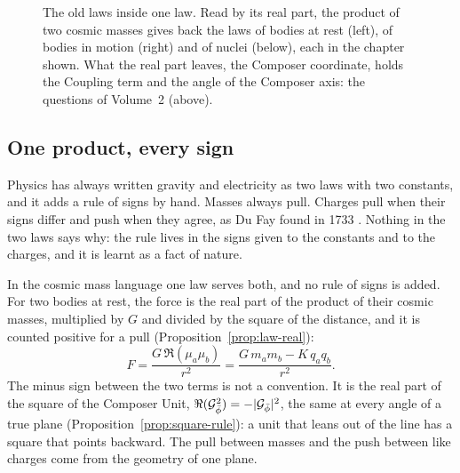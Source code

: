 \begin{figure}[tb]
\caption[The old laws inside one law]{The old laws inside one law. Read by its real part, the product of two cosmic masses gives back the laws of bodies at rest (left), of bodies in motion (right) and of nuclei (below), each in the chapter shown. What the real part leaves, the Composer coordinate, holds the Coupling term and the angle of the Composer axis: the questions of Volume~2 (above).}
\label{fig:al-map}
\end{figure}

\subsection{One product, every sign}\label{subsec:al-sign}

Physics has always written gravity and electricity as two laws with two constants, and it adds a rule of signs by hand. Masses always pull. Charges pull when their signs differ and push when they agree, as Du Fay found in 1733 \citep{DuFay1733}. Nothing in the two laws says why: the rule lives in the signs given to the constants and to the charges, and it is learnt as a fact of nature.

In the cosmic mass language one law serves both, and no rule of signs is added. For two bodies at rest, the force is the real part of the product of their cosmic masses, multiplied by $G$ and divided by the square of the distance, and it is counted positive for a pull (Proposition~\ref{prop:law-real}):
\[
F = \frac{G\,\Re(\mu_a\mu_b)}{r^2} = \frac{G\,m_a m_b - K\,q_a q_b}{r^2} .
\]
The minus sign between the two terms is not a convention. It is the real part of the square of the Composer Unit, $\Re(\mathcal{G}_{\bar{\phi}}^2) = -|\mathcal{G}_{\bar{\phi}}|^2$, the same at every angle of a true plane (Proposition~\ref{prop:square-rule}): a unit that leans out of the line has a square that points backward. The pull between masses and the push between like charges come from the geometry of one plane.

